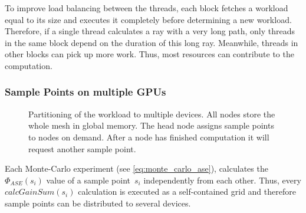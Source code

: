 To improve load balancing between the threads, each block fetches a
workload equal to its size and executes it completely before determining a new
workload. Therefore, if a single thread calculates a ray with a very long path,
only threads in the same block depend on the duration of this long ray.
Meanwhile, threads in other blocks can pick up more work. Thus, most resources
can contribute to the computation.
    
\subsubsection{Sample Points on multiple GPUs}
\label{subsubsec:multigpu}
\begin{figure}[H]
  \centerline
  {}
  \caption{Partitioning of the workload to multiple devices. All nodes
    store the whole mesh in global memory. The head node assigns
    sample points to nodes on demand. After a node has finished
    computation it will request another sample point.}
  \label{graphic:multigpu}
\end{figure}
Each Monte-Carlo experiment (see \cref{eq:monte_carlo_ase}), calculates
the $\Phi_{ASE}(s_i)$ value of a sample point~$s_i$ independently from each
other. Thus, every $calcGainSum(s_i)$ calculation is executed as a
self-contained grid and therefore sample points can be distributed to
several devices.


